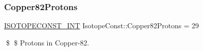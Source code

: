 \subsubsection{\texorpdfstring{Copper82\+Protons}{Copper82Protons}}
{\footnotesize\ttfamily \mbox{\hyperlink{group___isotope_const-_macros_ga5f18360b3e99483a35c32d789e62621c}{I\+S\+O\+T\+O\+P\+E\+C\+O\+N\+S\+T\+\_\+\+I\+NT}} Isotope\+Const\+::\+Copper82\+Protons = 29}

\$ \$ Protons in Copper-\/82. 